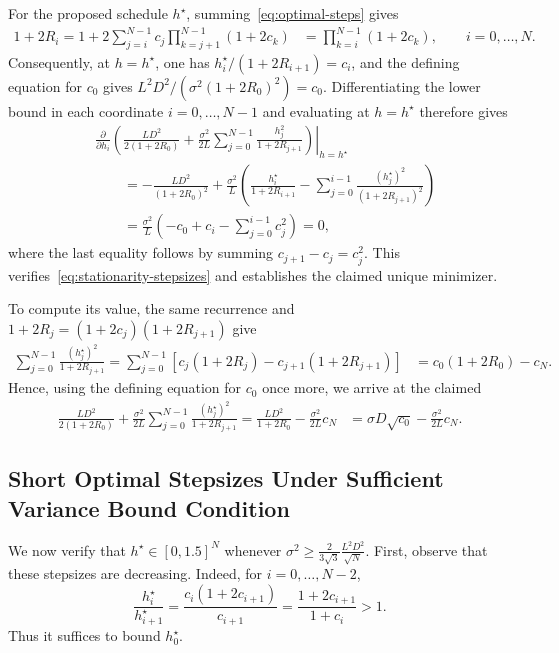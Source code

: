 \documentclass[11pt, hidelinks]{article}
\begin{document}
For the proposed schedule $h^\star$, summing~\eqref{eq:optimal-steps} gives
\begin{align*}
    1+2R_i
    =1+2\sum_{j=i}^{N-1}c_j
    \prod_{k=j+1}^{N-1}(1+2c_k) &=\prod_{k=i}^{N-1}(1+2c_k),
    \qquad i=0,\dots,N.
\end{align*}
Consequently, at $h=h^\star$, one has
$h_i^\star/(1+2R_{i+1})=c_i$, and the defining equation for $c_0$ gives
$L^2D^2/(\sigma^2(1+2R_0)^2)=c_0$.
Differentiating the lower bound in each coordinate $i=0,\dots,N-1$ and evaluating at $h=h^\star$ therefore gives
\begin{align*}
    &\left.
    \frac{\partial}{\partial h_i}
    \left(
        \frac{LD^2}{2(1+2R_0)}
        +\frac{\sigma^2}{2L}\sum_{j=0}^{N-1}
        \frac{h_j^2}{1+2R_{j+1}}
    \right)\right|_{h=h^\star}\\
    &\qquad=
    -\frac{LD^2}{(1+2R_0)^2}
    +\frac{\sigma^2}{L}
    \left(
        \frac{h_i^\star}{1+2R_{i+1}}
        -\sum_{j=0}^{i-1}
        \frac{(h_j^\star)^2}{(1+2R_{j+1})^2}
    \right)\\
    &\qquad=
    \frac{\sigma^2}{L}
    \left(-c_0+c_i-\sum_{j=0}^{i-1}c_j^2\right)
    =0,
\end{align*}
where the last equality follows by summing $c_{j+1}-c_j=c_j^2$.
This verifies~\eqref{eq:stationarity-stepsizes} and establishes the claimed unique minimizer.

To compute its value, the same recurrence and
$1+2R_j=(1+2c_j)(1+2R_{j+1})$ give
\begin{align*}
    \sum_{j=0}^{N-1}\frac{(h_j^\star)^2}{1+2R_{j+1}}
    =\sum_{j=0}^{N-1}
    \left[c_j(1+2R_j)-c_{j+1}(1+2R_{j+1})\right] &=c_0(1+2R_0)-c_N.
\end{align*}
Hence, using the defining equation for $c_0$ once more, we arrive at the claimed
\begin{align*}
    \frac{LD^2}{2(1+2R_0)}
    +\frac{\sigma^2}{2L}\sum_{j=0}^{N-1}
    \frac{(h_j^\star)^2}{1+2R_{j+1}}
    =\frac{LD^2}{1+2R_0}-\frac{\sigma^2}{2L}c_N &=\sigma D\sqrt{c_0}-\frac{\sigma^2}{2L}c_N.
\end{align*}

\subsection{Short Optimal Stepsizes Under Sufficient Variance Bound Condition}
\label{app:optimal-stepsizes-range}

We now verify that $h^\star\in[0,1.5]^N$ whenever
$\sigma^2\geq\frac{2}{3\sqrt{3}}\frac{L^2D^2}{\sqrt N}$.
First, observe that these stepsizes are decreasing. Indeed, for $i=0,\dots,N-2$,
\begin{equation*}
    \frac{h_i^\star}{h_{i+1}^\star}
    =\frac{c_i(1+2c_{i+1})}{c_{i+1}}
    =\frac{1+2c_{i+1}}{1+c_i}>1.
\end{equation*}
Thus it suffices to bound $h_0^\star$.
\end{document}
